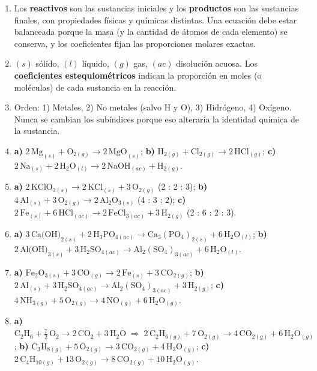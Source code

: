 \documentclass[12pt, letterpaper]{article}
\begin{document}
\begin{enumerate}[leftmargin=*, label=\textbf{\arabic*.}, start=1]
  \item Los \textbf{reactivos} son las sustancias iniciales y los \textbf{productos} son las sustancias finales, con propiedades físicas y químicas distintas. Una ecuación debe estar balanceada porque la masa (y la cantidad de átomos de cada elemento) se conserva, y los coeficientes fijan las proporciones molares exactas.
  \item $(s)$ sólido, $(l)$ líquido, $(g)$ gas, $(ac)$ disolución acuosa. Los \textbf{coeficientes estequiométricos} indican la proporción en moles (o moléculas) de cada sustancia en la reacción.
  \item Orden: 1) Metales, 2) No metales (salvo H y O), 3) Hidrógeno, 4) Oxígeno. Nunca se cambian los subíndices porque eso alteraría la identidad química de la sustancia.
  \item \textbf{a)} $2\,\text{Mg}_{(s)} + \text{O}_{2(g)} \longrightarrow 2\,\text{MgO}_{(s)}$; \quad \textbf{b)} $\text{H}_{2(g)} + \text{Cl}_{2(g)} \longrightarrow 2\,\text{HCl}_{(g)}$; \quad \textbf{c)} $2\,\text{Na}_{(s)} + 2\,\text{H}_2\text{O}_{(l)} \longrightarrow 2\,\text{NaOH}_{(ac)} + \text{H}_{2(g)}$.
  \item \textbf{a)} $2\,\text{KClO}_{3(s)} \longrightarrow 2\,\text{KCl}_{(s)} + 3\,\text{O}_{2(g)}$ (2 : 2 : 3); \quad \textbf{b)} $4\,\text{Al}_{(s)} + 3\,\text{O}_{2(g)} \longrightarrow 2\,\text{Al}_2\text{O}_{3(s)}$ (4 : 3 : 2); \quad \textbf{c)} $2\,\text{Fe}_{(s)} + 6\,\text{HCl}_{(ac)} \longrightarrow 2\,\text{FeCl}_{3(ac)} + 3\,\text{H}_{2(g)}$ (2 : 6 : 2 : 3).
  \item \textbf{a)} $3\,\text{Ca(OH)}_{2(s)} + 2\,\text{H}_3\text{PO}_{4(ac)} \longrightarrow \text{Ca}_3(\text{PO}_4)_{2(s)} + 6\,\text{H}_2\text{O}_{(l)}$; \quad \textbf{b)} $2\,\text{Al(OH)}_{3(s)} + 3\,\text{H}_2\text{SO}_{4(ac)} \longrightarrow \text{Al}_2(\text{SO}_4)_{3(ac)} + 6\,\text{H}_2\text{O}_{(l)}$.
  \item \textbf{a)} $\text{Fe}_2\text{O}_{3(s)} + 3\,\text{CO}_{(g)} \longrightarrow 2\,\text{Fe}_{(s)} + 3\,\text{CO}_{2(g)}$; \quad \textbf{b)} $2\,\text{Al}_{(s)} + 3\,\text{H}_2\text{SO}_{4(ac)} \longrightarrow \text{Al}_2(\text{SO}_4)_{3(ac)} + 3\,\text{H}_{2(g)}$; \quad \textbf{c)} $4\,\text{NH}_{3(g)} + 5\,\text{O}_{2(g)} \longrightarrow 4\,\text{NO}_{(g)} + 6\,\text{H}_2\text{O}_{(g)}$.
  \item \textbf{a)} $\text{C}_2\text{H}_6 + \frac{7}{2}\,\text{O}_2 \longrightarrow 2\,\text{CO}_2 + 3\,\text{H}_2\text{O} \;\Rightarrow\; 2\,\text{C}_2\text{H}_{6(g)} + 7\,\text{O}_{2(g)} \longrightarrow 4\,\text{CO}_{2(g)} + 6\,\text{H}_2\text{O}_{(g)}$; \quad \textbf{b)} $\text{C}_3\text{H}_{8(g)} + 5\,\text{O}_{2(g)} \longrightarrow 3\,\text{CO}_{2(g)} + 4\,\text{H}_2\text{O}_{(g)}$; \quad \textbf{c)} $2\,\text{C}_4\text{H}_{10(g)} + 13\,\text{O}_{2(g)} \longrightarrow 8\,\text{CO}_{2(g)} + 10\,\text{H}_2\text{O}_{(g)}$.

\end{enumerate}
\end{document}
